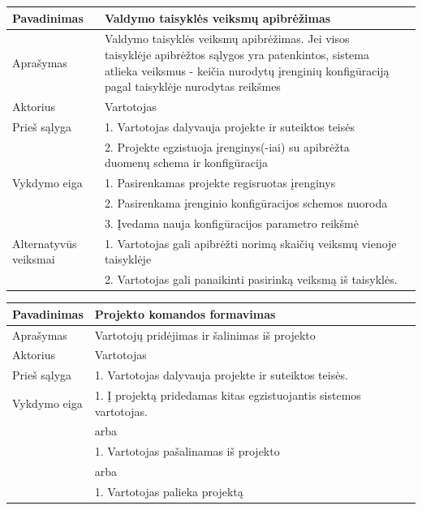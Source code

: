 \documentclass{VUMIFInfBakalaurinis}
\begin{document}
\begin{tabular}{  l  p{10cm}  p{15cm} }

\toprule
\textbf{Pavadinimas}
& \textbf{Valdymo taisyklės veiksmų apibrėžimas} \\
\midrule

Aprašymas
& Valdymo taisyklės veiksmų apibrėžimas. Jei visos taisyklėje apibrėžtos sąlygos yra patenkintos, sistema atlieka veiksmus - keičia nurodytų įrenginių konfigūraciją pagal taisyklėje nurodytas reikšmes \\

\hline
Aktorius    
& Vartotojas \\

\hline
Prieš sąlyga
& 1. Vartotojas dalyvauja projekte ir suteiktos teisės \\
& 2. Projekte egzistuoja įrenginys(-iai) su apibrėžta duomenų schema ir konfigūracija \\

\hline
Vykdymo eiga    
& 1. Pasirenkamas projekte regisruotas įrenginys \\
& 2. Pasirenkama įrenginio konfigūracijos schemos nuoroda \\
& 3. Įvedama nauja konfigūracijos parametro reikšmė \\

\hline
Alternatyvūs veiksmai
& 1. Vartotojas gali apibrėžti norimą skaičių veiksmų vienoje taisyklėje \\
& 2. Vartotojas gali panaikinti pasirinką veiksmą iš taisyklės. \\
\bottomrule
\end{tabular}

%
%
\begin{tabular}{  l  p{10cm}  p{15cm} }

\toprule
\textbf{Pavadinimas}
& \textbf{Projekto komandos formavimas} \\
\midrule

Aprašymas
& Vartotojų pridėjimas ir šalinimas iš projekto \\

\hline
Aktorius    
& Vartotojas \\

\hline
Prieš sąlyga
& 1. Vartotojas dalyvauja projekte ir suteiktos teisės. \\

\hline
Vykdymo eiga    
& 1. Į projektą pridedamas kitas egzistuojantis sistemos vartotojas. \\
& arba \\
& 1. Vartotojas pašalinamas iš projekto \\
& arba \\
& 1. Vartotojas palieka projektą \\
\bottomrule
\end{tabular}
\end{document}
